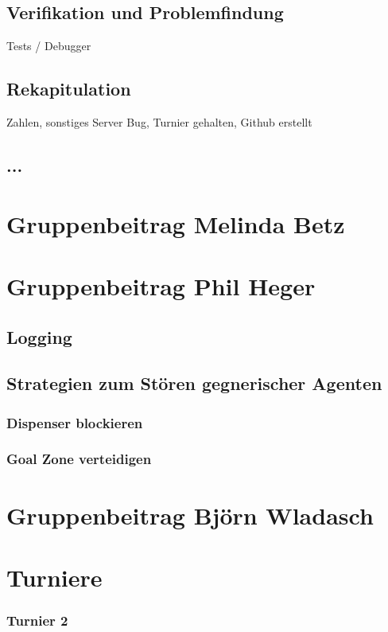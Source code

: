 \documentclass[runningheads]{llncs}
\begin{document}
\subsection{Verifikation und Problemfindung}\label{verifikation}
Tests / Debugger

\subsection{Rekapitulation}
Zahlen, sonstiges Server Bug, Turnier gehalten, Github erstellt

\subsection{...}

\section{Gruppenbeitrag Melinda Betz}

\section{Gruppenbeitrag Phil Heger}
\subsection{Logging}
\subsection{Strategien zum Stören gegnerischer Agenten}
\subsubsection{Dispenser blockieren}
\subsubsection{Goal Zone verteidigen}

\section{Gruppenbeitrag Björn Wladasch}

\section{Turniere}
\subsubsection{Turnier 2}
\end{document}
